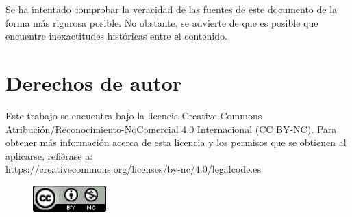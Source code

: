 \documentclass[12pt]{report}
\begin{document}
Se ha intentado comprobar la veracidad de las fuentes de este documento de la forma más rigurosa posible. No obstante, se advierte de que es posible que encuentre inexactitudes históricas entre el contenido.

\section{Derechos de autor}

Este trabajo se encuentra bajo la licencia Creative Commons Atribución/Reconocimiento-NoComercial 4.0 Internacional (CC BY-NC). Para obtener más información acerca de esta licencia y los permisos que se obtienen al aplicarse, refiérase a:\\
https://creativecommons.org/licenses/by-nc/4.0/legalcode.es
\begin{figure}[h]
	\centering
	\includegraphics[height=1cm]{cc-by-nc}
\end{figure}
\end{document}
